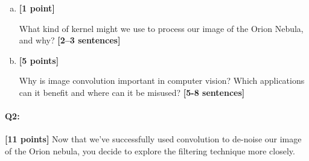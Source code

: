 \documentclass[11pt]{article}
\begin{document}
\begin{enumerate}[(a)]

\item \textbf{[1 point]}
\begin{tcolorbox}[colback=orange!5!white,colframe=orange!75!black]
What kind of kernel might we use to process our image of the Orion Nebula, and why? \textbf{[2--3 sentences]}
\end{tcolorbox}

\pagebreak

\item \textbf{[5 points]}
\begin{tcolorbox}[colback=orange!5!white,colframe=orange!75!black]
Why is image convolution important in computer vision? Which applications can it benefit and where can it be misused? \textbf{[5-8 sentences]}
\end{tcolorbox}


\end{enumerate}


\pagebreak
\paragraph{Q2:} \textbf{[11 points]} Now that we've successfully used convolution to de-noise our image of the Orion nebula, you decide to explore the filtering technique more closely. 
\end{document}
